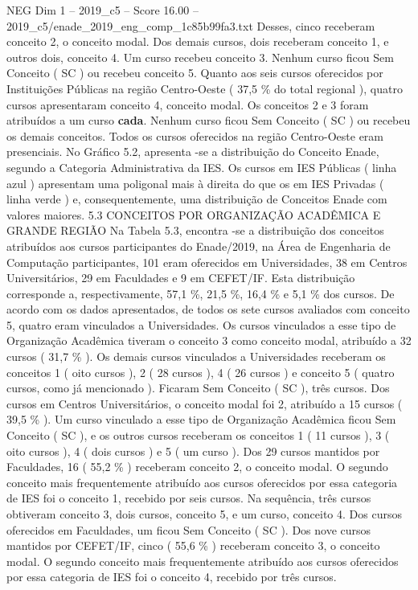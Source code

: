 \begin{textsample}{NEG Dim 1 – 2019\_c5 – Score 16.00 – 2019\_c5/enade\_2019\_eng\_comp\_1c85b99fa3.txt}
Desses, cinco receberam conceito 2, o conceito modal.
Dos demais cursos, dois receberam conceito 1, e outros dois, conceito 4.
Um curso recebeu conceito 3.
Nenhum curso ficou Sem Conceito ( SC ) ou recebeu conceito 5.
Quanto aos seis cursos oferecidos por Instituições Públicas na região Centro-Oeste ( 37,5 \% do total regional ), quatro cursos apresentaram conceito 4, conceito modal.
Os conceitos 2 e 3 foram atribuídos a um curso \textbf{cada}.
Nenhum curso ficou Sem Conceito ( SC ) ou recebeu os demais conceitos.
Todos os cursos oferecidos na região Centro-Oeste eram presenciais.
No Gráfico 5.2, apresenta -se a distribuição do Conceito Enade, segundo a Categoria Administrativa da IES.
Os cursos em IES Públicas ( linha azul ) apresentam uma poligonal mais à direita do que os em IES Privadas ( linha verde ) e, consequentemente, uma distribuição de Conceitos Enade com valores maiores. 5.3 CONCEITOS POR ORGANIZAÇÃO ACADÊMICA E GRANDE REGIÃO Na Tabela 5.3, encontra -se a distribuição dos conceitos atribuídos aos cursos participantes do Enade/2019, na Área de Engenharia de Computação participantes, 101 eram oferecidos em Universidades, 38 em Centros Universitários, 29 em Faculdades e 9 em CEFET/IF.
Esta distribuição corresponde a, respectivamente, 57,1 \%, 21,5 \%, 16,4 \% e 5,1 \% dos cursos.
De acordo com os dados apresentados, de todos os sete cursos avaliados com conceito 5, quatro eram vinculados a Universidades.
Os cursos vinculados a esse tipo de Organização Acadêmica tiveram o conceito 3 como conceito modal, atribuído a 32 cursos ( 31,7 \% ).
Os demais cursos vinculados a Universidades receberam os conceitos 1 ( oito cursos ), 2 ( 28 cursos ), 4 ( 26 cursos ) e conceito 5 ( quatro cursos, como já mencionado ).
Ficaram Sem Conceito ( SC ), três cursos.
Dos cursos em Centros Universitários, o conceito modal foi 2, atribuído a 15 cursos ( 39,5 \% ).
Um curso vinculado a esse tipo de Organização Acadêmica ficou Sem Conceito ( SC ), e os outros cursos receberam os conceitos 1 ( 11 cursos ), 3 ( oito cursos ), 4 ( dois cursos ) e 5 ( um curso ).
Dos 29 cursos mantidos por Faculdades, 16 ( 55,2 \% ) receberam conceito 2, o conceito modal.
O segundo conceito mais frequentemente atribuído aos cursos oferecidos por essa categoria de IES foi o conceito 1, recebido por seis cursos.
Na sequência, três cursos obtiveram conceito 3, dois cursos, conceito 5, e um curso, conceito 4.
Dos cursos oferecidos em Faculdades, um ficou Sem Conceito ( SC ).
Dos nove cursos mantidos por CEFET/IF, cinco ( 55,6 \% ) receberam conceito 3, o conceito modal.
O segundo conceito mais frequentemente atribuído aos cursos oferecidos por essa categoria de IES foi o conceito 4, recebido por três cursos.

\end{textsample}

